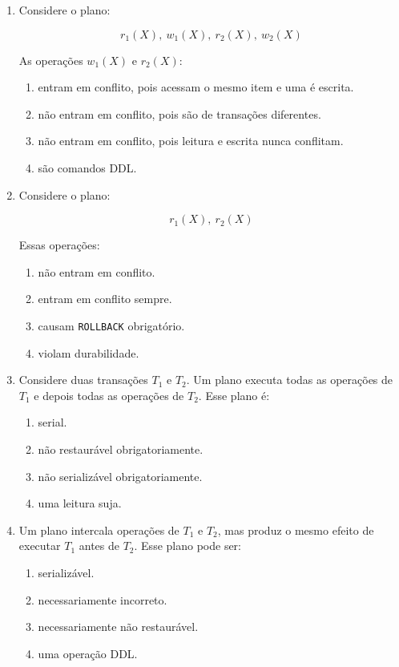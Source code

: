 \documentclass[12pt,a4paper]{article}
\begin{document}
\begin{enumerate}[resume,label=\textbf{Q\arabic*.}]
\item Considere o plano:

\[
r_1(X),\ w_1(X),\ r_2(X),\ w_2(X)
\]

As operações $w_1(X)$ e $r_2(X)$:

\begin{enumerate}[label=\alph*)]
    \item entram em conflito, pois acessam o mesmo item e uma é escrita.
    \item não entram em conflito, pois são de transações diferentes.
    \item não entram em conflito, pois leitura e escrita nunca conflitam.
    \item são comandos DDL.
\end{enumerate}

\item Considere o plano:

\[
r_1(X),\ r_2(X)
\]

Essas operações:

\begin{enumerate}[label=\alph*)]
    \item não entram em conflito.
    \item entram em conflito sempre.
    \item causam \texttt{ROLLBACK} obrigatório.
    \item violam durabilidade.
\end{enumerate}

\item Considere duas transações $T_1$ e $T_2$. Um plano executa todas as operações de $T_1$ e depois todas as operações de $T_2$. Esse plano é:

\begin{enumerate}[label=\alph*)]
    \item serial.
    \item não restaurável obrigatoriamente.
    \item não serializável obrigatoriamente.
    \item uma leitura suja.
\end{enumerate}

\item Um plano intercala operações de $T_1$ e $T_2$, mas produz o mesmo efeito de executar $T_1$ antes de $T_2$. Esse plano pode ser:

\begin{enumerate}[label=\alph*)]
    \item serializável.
    \item necessariamente incorreto.
    \item necessariamente não restaurável.
    \item uma operação DDL.
\end{enumerate}


\end{enumerate}
\end{document}
